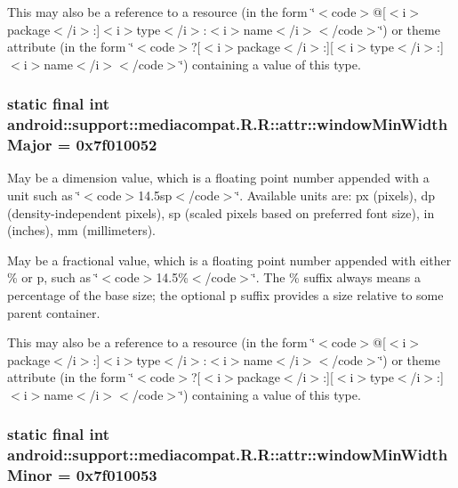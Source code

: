 This may also be a reference to a resource (in the form \char`\"{}$<$code$>$@\mbox{[}$<$i$>$package$<$/i$>$:\mbox{]}$<$i$>$type$<$/i$>$:$<$i$>$name$<$/i$>$$<$/code$>$\char`\"{}) or theme attribute (in the form \char`\"{}$<$code$>$?\mbox{[}$<$i$>$package$<$/i$>$:\mbox{]}\mbox{[}$<$i$>$type$<$/i$>$:\mbox{]}$<$i$>$name$<$/i$>$$<$/code$>$\char`\"{}) containing a value of this type. \hypertarget{classandroid_1_1support_1_1mediacompat_1_1_r_1_1attr_48587a0fc26be08f5b0505ff792a2d03}{
\subsubsection[{windowMinWidthMajor}]{\setlength{\rightskip}{0pt plus 5cm}static final int android::support::mediacompat.R.R::attr::windowMinWidthMajor = 0x7f010052}}
\label{classandroid_1_1support_1_1mediacompat_1_1_r_1_1attr_48587a0fc26be08f5b0505ff792a2d03}


May be a dimension value, which is a floating point number appended with a unit such as \char`\"{}$<$code$>$14.5sp$<$/code$>$\char`\"{}. Available units are: px (pixels), dp (density-independent pixels), sp (scaled pixels based on preferred font size), in (inches), mm (millimeters). 

May be a fractional value, which is a floating point number appended with either \% or p, such as \char`\"{}$<$code$>$14.5\%$<$/code$>$\char`\"{}. The \% suffix always means a percentage of the base size; the optional p suffix provides a size relative to some parent container. 

This may also be a reference to a resource (in the form \char`\"{}$<$code$>$@\mbox{[}$<$i$>$package$<$/i$>$:\mbox{]}$<$i$>$type$<$/i$>$:$<$i$>$name$<$/i$>$$<$/code$>$\char`\"{}) or theme attribute (in the form \char`\"{}$<$code$>$?\mbox{[}$<$i$>$package$<$/i$>$:\mbox{]}\mbox{[}$<$i$>$type$<$/i$>$:\mbox{]}$<$i$>$name$<$/i$>$$<$/code$>$\char`\"{}) containing a value of this type. \hypertarget{classandroid_1_1support_1_1mediacompat_1_1_r_1_1attr_e27de01ba06866ac66842f9119177673}{
\subsubsection[{windowMinWidthMinor}]{\setlength{\rightskip}{0pt plus 5cm}static final int android::support::mediacompat.R.R::attr::windowMinWidthMinor = 0x7f010053}}
\label{classandroid_1_1support_1_1mediacompat_1_1_r_1_1attr_e27de01ba06866ac66842f9119177673}


